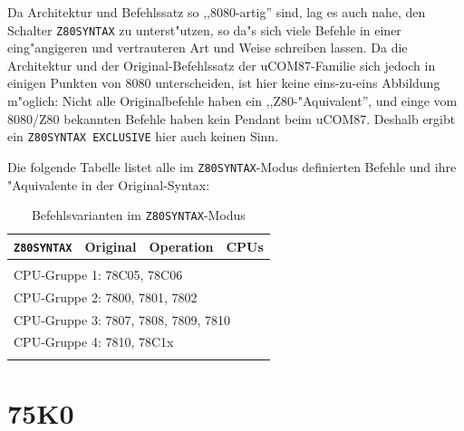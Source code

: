 \documentclass[12pt,a4paper,twoside]{report}
\begin{document}
Da Architektur und Befehlssatz so ,,8080-artig''
sind, lag es auch nahe, den Schalter {\tt Z80SYNTAX} zu
unterst"utzen, so da"s sich viele Befehle in einer eing"angigeren
und vertrauteren Art und Weise schreiben lassen.  Da die
Architektur und der Original-Befehlssatz der uCOM87-Familie 
sich jedoch in einigen Punkten von 8080 unterscheiden, ist hier
keine eins-zu-eins Abbildung m"oglich: Nicht alle Originalbefehle
haben ein ,,Z80-"Aquivalent'', und einge vom 8080/Z80 bekannten
Befehle haben kein Pendant beim uCOM87.  Deshalb ergibt ein
{\tt Z80SYNTAX EXCLUSIVE} hier auch keinen Sinn.

Die folgende Tabelle listet alle im {\tt Z80SYNTAX}-Modus
definierten Befehle und ihre "Aquivalente in der Original-Syntax:

\begin{longtable}{|l|l|l|l|}
\hline
{\tt Z80SYNTAX} & Original & Operation & CPUs \\
\hline
\hline
\endhead

\\ \hline
\multicolumn{4}{|l|}{CPU-Gruppe 1: 78C05, 78C06} \\
\multicolumn{4}{|l|}{CPU-Gruppe 2: 7800, 7801, 7802} \\
\multicolumn{4}{|l|}{CPU-Gruppe 3: 7807, 7808, 7809, 7810} \\
\multicolumn{4}{|l|}{CPU-Gruppe 4: 7810, 78C1x} \\
\hline
\caption{Befehlsvarianten im {\tt Z80SYNTAX}-Modus}
\end{longtable}


\section{75K0}
\label{75K0Spec}
\end{document}
